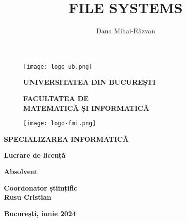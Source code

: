 \begin{titlepage}


\author{Dana Mihai-Răzvan}
\title{FILE SYSTEMS}

\begin{figure}[!htb]
    \centering
    \begin{minipage}{0.2\textwidth}
        \texttt{[image: logo-ub.png]}
    \end{minipage}
    \begin{minipage}{0.5\textwidth}
        \large
        \vspace{0.2cm}
        \begin{center}
            \textbf{UNIVERSITATEA DIN BUCUREȘTI}
        \end{center}
        \vspace{0.3cm}
        \begin{center}
            \textbf{
                FACULTATEA DE \\
                MATEMATICĂ ȘI INFORMATICĂ
            }
        \end{center}
    \end{minipage}
    \begin{minipage}{0.2\textwidth}
        \texttt{[image: logo-fmi.png]}
    \end{minipage}
\end{figure}

\begin{center}
\textbf{SPECIALIZAREA INFORMATICĂ}
\end{center}

\vspace{1cm}

\begin{center}
\Large \textbf{Lucrare de licență}
\end{center}

\begin{center}
\huge \textbf{\MakeUppercase{\@title}}
\end{center}

\vspace{3cm}

\begin{center}
\large \textbf{Absolvent \\ \@author}
\end{center}

\vspace{0.25cm}

\begin{center}
\large \textbf{Coordonator științific \\ Rusu Cristian}
\end{center}

\vspace{2cm}

\begin{center}
\Large \textbf{București, iunie 2024}
\end{center}
\end{titlepage}